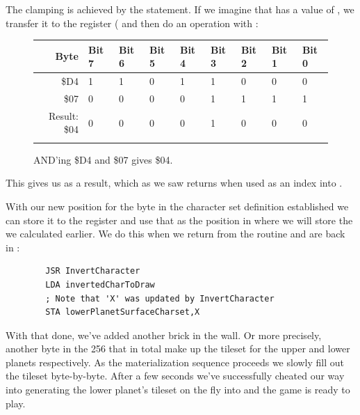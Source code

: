 The clamping is achieved by the  statement. If we imagine that  has a value of
, we transfer it to the  register ( and then do an  operation
with :

\begin{figure}[H]
  {
    \setlength{\tabcolsep}{3.0pt}
    \setlength\cmidrulewidth{\heavyrulewidth} %
    \begin{adjustbox}{width=10cm,center}

      \begin{tabular}{rllllllll}
        \toprule
        Byte & Bit 7 & Bit 6 & Bit 5 & Bit 4 & Bit 3 & Bit 2 & Bit 1 & Bit 0        \\
        \midrule
        \$D4 & 1 & 1 & 0 & 1 & 1 & 0 & 0 & 0 \\
        \$07 & 0 & 0 & 0 & 0 & 1 & 1 & 1 & 1 \\
        \midrule
        Result: \$04 & 0 & 0 & 0 & 0 & 1 & 0 & 0 & 0 \\
        \addlinespace
        \bottomrule
      \end{tabular}

    \end{adjustbox}

  }\caption*{AND'ing \$D4 and \$07 gives \$04.}
\end{figure}

This gives us  as a result, which as we saw returns  when used as an index
into .

With our new position for the byte in the character set definition established we can store it to the
 register and use that as the position in  where we will
store the  we calculated earlier. We do this when we return from the
 routine and are back in :

\begin{lstlisting}
        JSR InvertCharacter
        LDA invertedCharToDraw
        ; Note that 'X' was updated by InvertCharacter
        STA lowerPlanetSurfaceCharset,X
\end{lstlisting}

With that done, we've added another brick in the wall. Or more precisely, another byte in the 
256 that in total make up the tileset for the upper and lower planets respectively. As the 
materialization sequence proceeds we slowly fill out the tileset byte-by-byte. After a few
seconds we've successfully cheated our way into generating the lower planet's tileset on the
fly into  and the game is ready to play.


